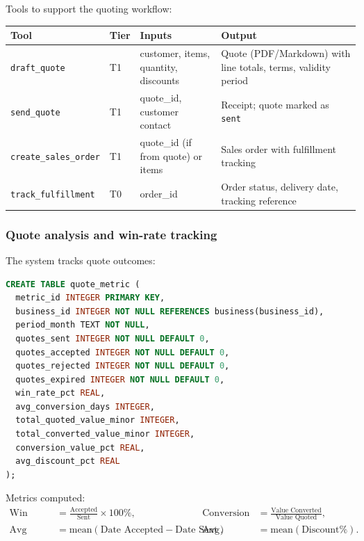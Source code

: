 \documentclass[10pt,a4paper]{article}
\newcommand{\code}[1]{\texttt{\small #1}}
\begin{document}
Tools to support the quoting workflow:

\begin{center}
\begin{tabularx}{\textwidth}{@{}p{4.2cm}p{1.0cm}p{4.2cm}Y@{}}
\toprule
\textbf{Tool} & \textbf{Tier} & \textbf{Inputs} & \textbf{Output}\\
\midrule
\code{draft\_quote} & T1 & customer, items, quantity, discounts & Quote (PDF/Markdown) with line totals, terms, validity period\\
\code{send\_quote} & T1 & quote\_id, customer contact & Receipt; quote marked as \code{sent}\\
\code{create\_sales\_order} & T1 & quote\_id (if from quote) or items & Sales order with fulfillment tracking\\
\code{track\_fulfillment} & T0 & order\_id & Order status, delivery date, tracking reference\\
\bottomrule
\end{tabularx}
\end{center}

\subsubsection{Quote analysis and win-rate tracking}

The system tracks quote outcomes:

\begin{lstlisting}[language=SQL,caption={Quote performance metrics}]
CREATE TABLE quote_metric (
  metric_id INTEGER PRIMARY KEY,
  business_id INTEGER NOT NULL REFERENCES business(business_id),
  period_month TEXT NOT NULL,
  quotes_sent INTEGER NOT NULL DEFAULT 0,
  quotes_accepted INTEGER NOT NULL DEFAULT 0,
  quotes_rejected INTEGER NOT NULL DEFAULT 0,
  quotes_expired INTEGER NOT NULL DEFAULT 0,
  win_rate_pct REAL,
  avg_conversion_days INTEGER,
  total_quoted_value_minor INTEGER,
  total_converted_value_minor INTEGER,
  conversion_value_pct REAL,
  avg_discount_pct REAL
);
\end{lstlisting}

Metrics computed:
\begin{align*}
\text{Win Rate} &= \frac{\text{Accepted}}{\text{Sent}} \times 100\%, &\quad
\text{Conversion Ratio} &= \frac{\text{Value Converted}}{\text{Value Quoted}},\\
\text{Avg Response Time} &= \text{mean}(\text{Date Accepted} - \text{Date Sent}), &\quad
\text{Avg Discount} &= \text{mean}(\text{Discount\%}).
\end{align*}
\end{document}
